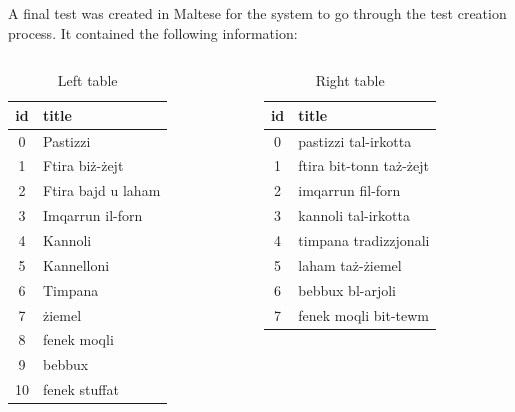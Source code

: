 \documentclass[8pt]{beamer} %
\begin{document}
\begin{frame}
	A final test was created in Maltese for the system to go through the test creation process. It contained the following information:
	
	\begin{columns}
		\begin{column}{0.25\textwidth}
			
			\tiny
			\begin{table}
				\centering
				\begin{tabular}{|c|l|}
					\hline
					\textbf{id} & \textbf{title} \\ \hline
					0 & Pastizzi \\
					1 & Ftira biż-żejt \\
					2 & Ftira bajd u laham \\
					3 & Imqarrun il-forn \\
					4 & Kannoli \\
					5 & Kannelloni \\
					6 & Timpana \\
					7 & żiemel \\
					8 & fenek moqli \\
					9 & bebbux \\
					10 & fenek stuffat \\
					\hline
				\end{tabular}
				\caption{Left table}
			\end{table}
		\end{column}
		\begin{column}{0.25\textwidth}
			\tiny
			\begin{table}
				\centering
				\begin{tabular}{|c|l|}
					\hline
					\textbf{id} & \textbf{title} \\ \hline
					0 & pastizzi tal-irkotta \\
					1 & ftira bit-tonn taż-żejt \\
					2 & imqarrun fil-forn \\
					3 & kannoli tal-irkotta \\
					4 & timpana tradizzjonali \\
					5 & laham taż-żiemel \\
					6 & bebbux bl-arjoli \\
					7 & fenek moqli bit-tewm \\
					\hline
				\end{tabular}
				\caption{Right table}
			\end{table}
		\end{column}

\end{columns}
\end{frame}
\end{document}
